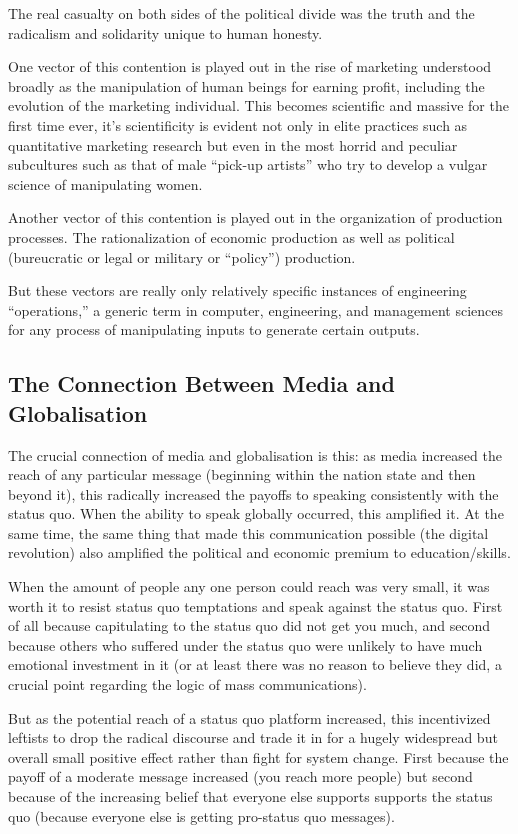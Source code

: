 \documentclass[12pt,book]{article}
\begin{document}
The real casualty on both sides of the political divide was the truth
and the radicalism and solidarity unique to human honesty.

One vector of this contention is played out in the rise of marketing
understood broadly as the manipulation of human beings for earning
profit, including the evolution of the marketing individual. This
becomes scientific and massive for the first time ever, it's
scientificity is evident not only in elite practices such as
quantitative marketing research but even in the most horrid and peculiar
subcultures such as that of male ``pick-up artists'' who try to develop
a vulgar science of manipulating women.

Another vector of this contention is played out in the organization of
production processes. The rationalization of economic production as well
as political (bureucratic or legal or military or ``policy'')
production.

But these vectors are really only relatively specific instances of
engineering ``operations,'' a generic term in computer, engineering, and
management sciences for any process of manipulating inputs to generate
certain outputs.

\subsection{The Connection Between Media and
Globalisation}\label{the-connection-between-media-and-globalisation}

The crucial connection of media and globalisation is this: as media
increased the reach of any particular message (beginning within the
nation state and then beyond it), this radically increased the payoffs
to speaking consistently with the status quo. When the ability to speak
globally occurred, this amplified it. At the same time, the same thing
that made this communication possible (the digital revolution) also
amplified the political and economic premium to education/skills.

When the amount of people any one person could reach was very small, it
was worth it to resist status quo temptations and speak against the
status quo. First of all because capitulating to the status quo did not
get you much, and second because others who suffered under the status
quo were unlikely to have much emotional investment in it (or at least
there was no reason to believe they did, a crucial point regarding the
logic of mass communications).

But as the potential reach of a status quo platform increased, this
incentivized leftists to drop the radical discourse and trade it in for
a hugely widespread but overall small positive effect rather than fight
for system change. First because the payoff of a moderate message
increased (you reach more people) but second because of the increasing
belief that everyone else supports supports the status quo (because
everyone else is getting pro-status quo messages).
\end{document}
